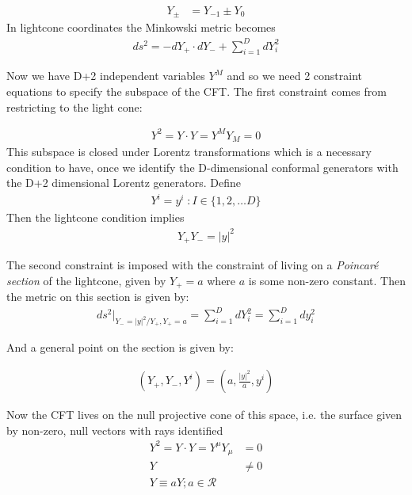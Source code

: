   \begin{align}
   Y_\pm &= Y_{-1} \pm Y_{0}
  \end{align}
  In lightcone coordinates the Minkowski metric becomes
  \begin{align}
   ds^2 = - dY_+ \cdot dY_- + \sum_{i=1}^D dY_i^2 
  \end{align}

   Now we have D+2 independent variables $Y^M$ and so we need 2 constraint equations to specify the subspace of the CFT. The first constraint comes from restricting to the light cone:
   
   \begin{align}
    Y^2=Y\cdot Y = Y^M Y_M = 0
   \end{align}
  This subspace is closed under Lorentz transformations which is a necessary condition to have, once we identify the D-dimensional conformal generators with the D+2 dimensional Lorentz generators.
  Define 
  \begin{align}
   Y^i = y^i \; : I \in \{1,2,\dots D \}
  \end{align}
  Then the lightcone condition implies
  \begin{align}
   Y_+ Y_- = |y|^2
  \end{align}

  The second constraint is imposed with the constraint of living on a \emph{Poincar\'{e} section} of the lightcone, given by $Y_+ = a$ where $a$ is some non-zero constant. Then the metric on this section is given by:
  \begin{align}
   ds^2 |_{Y_- = |y|^2/Y_+ , Y_+=a} = \sum_{i=1}^D dY_i^2 = \sum_{i=1}^D dy_i^2
  \end{align}
  
  And a general point on the section is given by:
  
  \begin{align}
   (Y_+,Y_-,Y^i) = \left( a,\frac{|y|^2}{a}, y^i \right)
  \end{align}

  
  Now the CFT lives on the null projective cone of this space, i.e. the surface given by non-zero, null vectors with rays identified
  \begin{align}
   Y^2=Y\cdot Y = Y^\mu Y_\mu &= 0 \\
   Y &\neq 0 \\
   Y \equiv aY ; a \in \mathcal{R}
  \end{align}


